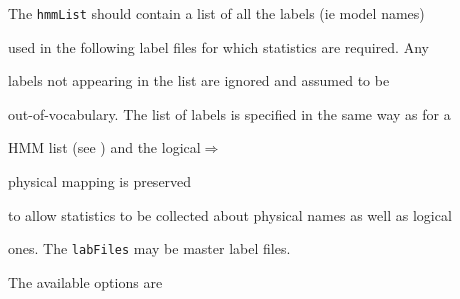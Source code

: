 The {\tt hmmList} should contain a list of all the labels (ie model names)


used in the following label files for which statistics are required.  Any


labels not appearing in the list are ignored and assumed to be 


out-of-vocabulary.  The list of labels is specified in the same way as for a


HMM list (see ) and the logical$\Rightarrow$ 


physical mapping is preserved


to allow statistics to be collected about physical names as well as logical 


ones.  The {\tt labFiles} may be master label files.


The available options are





